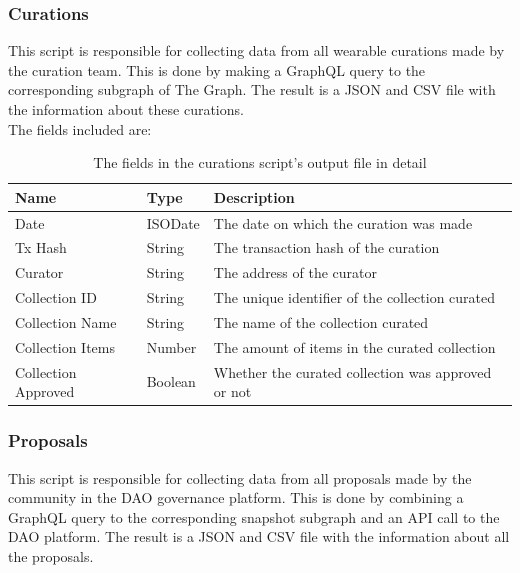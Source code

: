 \documentclass[MSE,Master,english]{twbook}%
\begin{document}
\subsubsection{Curations}
This script is responsible for collecting data from all wearable curations made by the curation team. This is done by making a GraphQL query to the corresponding subgraph of The Graph. The result is a JSON and CSV file with the information about these curations. \\

The fields included are:
\begin{table}[H]
  \centering
  \begin{tabularx}{\textwidth}{|l|l|X|}
  \hline
  \textbf{Name}       & \textbf{Type} & \textbf{Description}                               \\ \hline
  Date                & ISODate       & The date on which the curation was made            \\ \hline
  Tx Hash             & String        & The transaction hash of the curation               \\ \hline
  Curator             & String        & The address of the curator                         \\ \hline
  Collection ID       & String        & The unique identifier of the collection curated    \\ \hline
  Collection Name     & String        & The name of the collection curated                 \\ \hline
  Collection Items    & Number        & The amount of items in the curated collection      \\ \hline
  Collection Approved & Boolean       & Whether the curated collection was approved or not \\ \hline
  \end{tabularx}
  \caption{The fields in the curations script's output file in detail}
  \label{table:curations}
  \end{table}


\subsubsection{Proposals\label{proposals-script}}
This script is responsible for collecting data from all proposals made by the community in the DAO governance platform. This is done by combining a GraphQL query to the corresponding snapshot subgraph and an API call to the DAO platform. The result is a JSON and CSV file with the information about all the proposals. \\
\end{document}
